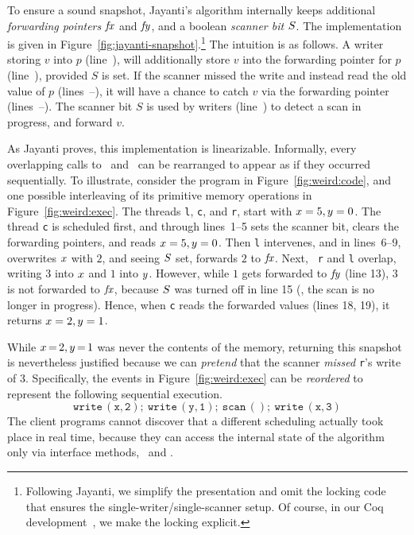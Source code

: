 

To ensure a sound snapshot, Jayanti's algorithm internally keeps
additional \emph{forwarding pointers} $\mathit{fx}$ and $\mathit{fy}$, and a boolean
\emph{scanner bit} $S$. The implementation is given in
Figure~\ref{fig:jayanti-snapshot}.\footnote{Following Jayanti, we
  simplify the presentation and omit the locking code that ensures the
  single-writer/single-scanner setup. Of course, in our Coq
  development~\cite{CoqFiles}, we make the locking explicit.}
%
The intuition is as follows. A writer storing $v$ into $p$
(line~\lineWrtWrt), will additionally store $v$ into the forwarding
pointer for $p$ (line~\lineWrtFwd), provided $S$ is set. If the
scanner missed the write and instead read the old value of $p$
(lines~\lineScanReadsX--\lineScanReadsY), it will have a chance to
catch $v$ via the forwarding pointer
(lines~\lineScanReadsFX--\lineScanReadsFY). The scanner bit $S$ is
used by writers (line~\lineWrtChk) to detect a scan in progress, and
forward $v$.


 
As Jayanti proves, this implementation is linearizable. Informally,
every overlapping calls to \jywrite~and \jyscan~can be rearranged to
appear as if they occurred sequentially.  To illustrate, consider the
program in Figure~\ref{fig:weird:code}, and one possible interleaving
of its primitive memory operations in Figure~\ref{fig:weird:exec}. The
threads {\tt l}, {\tt c}, and {\tt r}, start with $x = 5, y = 0$.
%
The thread {\tt c} is scheduled first, and through lines~1--5 sets the
scanner bit, clears the forwarding pointers, and reads $x = 5, y =
0$. Then {\tt l} intervenes, and in lines~6--9, overwrites
$x$ with $2$, and seeing $S$ set, forwards $2$ to $\mathit{fx}$. Next, {\tt
  r} and {\tt l} overlap, writing $3$ into $x$ and $1$ into
$y$. However, while $1$ gets forwarded to $\mathit{fy}$ (line 13), $3$ is not
forwarded to $\mathit{fx}$, because $S$ was turned off in line 15 (\ie, the
scan is no longer in progress). Hence, when {\tt c} reads the
forwarded values (lines 18, 19), it returns $x = 2, y = 1$.

While $x\,{=}\,2, y\,{=}\,1$ was never the contents of the memory,
returning this snapshot is nevertheless justified because we can
\emph{pretend} that the scanner \emph{missed} {\tt r}'s write of
$3$. Specifically, the events in Figure~\ref{fig:weird:exec} can be
\emph{reordered} to represent the following sequential execution.
%
\begin{equation}
\mathtt{write\, (x, 2);\ write\, (y,1);\ scan\, ();\ write\, (x,
  3)} \label{eq:lin}
\end{equation}
The client programs cannot discover that a different scheduling
actually took place in real time, because they can access the internal
state of the algorithm only via interface methods, \jywrite~and \jyscan.

